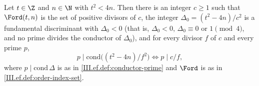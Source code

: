 Let $t\in\Z$ and $n\in\N$ with $t^2<4n$. Then there is an integer $c\ge1$ such that $\Ford(t,n)$ is the set of positive divisors of $c$, the integer
$\Delta_0=(t^2-4n)/c^2$ is a fundamental discriminant with $\Delta_0<0$ (that is, $\Delta_0<0$, $\Delta_0\equiv0$ or $1\pmod4$, and no prime divides the
conductor of $\Delta_0$), and for every divisor $f$ of $c$ and every prime $p$,
\[
  p\mid\mathrm{cond}\bigl((t^2-4n)/f^2\bigr)\iff p\mid c/f,
\]
where $p\mid\mathrm{cond}\,\Delta$ is as in \cref{III.ef.def:conductor-prime} and $\Ford$ is as in \cref{III.ef.def:order-index-set}.
